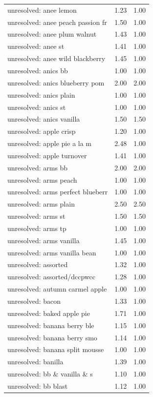 \begin{table}
\begin{tabular}{lrr}
unresolved: anee lemon & 1.23 & 1.00 \\
unresolved: anee peach passion fr & 1.50 & 1.00 \\
unresolved: anee plum walnut & 1.43 & 1.00 \\
unresolved: anee st & 1.41 & 1.00 \\
unresolved: anee wild blackberry & 1.45 & 1.00 \\
unresolved: anics bb & 1.00 & 1.00 \\
unresolved: anics blueberry pom & 2.00 & 2.00 \\
unresolved: anics plain & 1.00 & 1.00 \\
unresolved: anics st & 1.00 & 1.00 \\
unresolved: anics vanilla & 1.50 & 1.50 \\
unresolved: apple crisp & 1.20 & 1.00 \\
unresolved: apple pie a la m & 2.48 & 1.00 \\
unresolved: apple turnover & 1.41 & 1.00 \\
unresolved: arms bb & 2.00 & 2.00 \\
unresolved: arms peach & 1.00 & 1.00 \\
unresolved: arms perfect blueberr & 1.00 & 1.00 \\
unresolved: arms plain & 2.50 & 2.50 \\
unresolved: arms st & 1.50 & 1.50 \\
unresolved: arms tp & 1.00 & 1.00 \\
unresolved: arms vanilla & 1.45 & 1.00 \\
unresolved: arms vanilla bean & 1.00 & 1.00 \\
unresolved: assorted & 1.32 & 1.00 \\
unresolved: assorted/dccpwcc & 1.28 & 1.00 \\
unresolved: autumn carmel apple & 1.00 & 1.00 \\
unresolved: bacon & 1.33 & 1.00 \\
unresolved: baked apple pie & 1.71 & 1.00 \\
unresolved: banana berry ble & 1.15 & 1.00 \\
unresolved: banana berry smo & 1.14 & 1.00 \\
unresolved: banana split mousse & 1.00 & 1.00 \\
unresolved: banilla & 1.39 & 1.00 \\
unresolved: bb \& vanilla \& s & 1.10 & 1.00 \\
unresolved: bb blast & 1.12 & 1.00 \\

\end{tabular}
\end{table}
